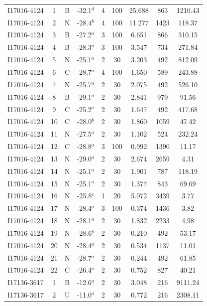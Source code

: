\begin{table}
\begin{tabular}{ccccccccc}
I17016-4124 & 1 & B & -32.1$^{d}$ & 4 & 100 & 25.688 & 863 & 1210.43 \\
I17016-4124 & 2 & N & -28.4$^{b}$ & 4 & 100 & 11.277 & 1423 & 118.37 \\
I17016-4124 & 3 & B & -27.2$^{a}$ & 3 & 100 & 6.651 & 866 & 310.15 \\
I17016-4124 & 4 & B & -28.3$^{a}$ & 3 & 100 & 3.547 & 734 & 271.84 \\
I17016-4124 & 5 & N & -25.1$^{a}$ & 2 & 30 & 3.203 & 492 & 812.09 \\
I17016-4124 & 6 & C & -28.7$^{a}$ & 4 & 100 & 1.650 & 589 & 243.88 \\
I17016-4124 & 7 & N & -25.7$^{a}$ & 2 & 30 & 2.075 & 492 & 526.10 \\
I17016-4124 & 8 & B & -29.1$^{a}$ & 2 & 30 & 2.841 & 979 & 91.56 \\
I17016-4124 & 9 & C & -25.2$^{a}$ & 2 & 30 & 1.647 & 492 & 417.68 \\
I17016-4124 & 10 & C & -28.0$^{b}$ & 2 & 30 & 1.860 & 1059 & 47.42 \\
I17016-4124 & 11 & N & -27.5$^{a}$ & 2 & 30 & 1.102 & 524 & 232.24 \\
I17016-4124 & 12 & C & -28.8$^{a}$ & 3 & 100 & 0.992 & 1390 & 11.17 \\
I17016-4124 & 13 & N & -29.0$^{a}$ & 2 & 30 & 2.674 & 2659 & 4.31 \\
I17016-4124 & 14 & N & -25.1$^{a}$ & 2 & 30 & 1.901 & 787 & 118.19 \\
I17016-4124 & 15 & N & -25.1$^{a}$ & 2 & 30 & 1.377 & 843 & 69.69 \\
I17016-4124 & 16 & N & -25.8$^{c}$ & 1 & 20 & 5.072 & 3439 & 3.77 \\
I17016-4124 & 17 & N & -28.4$^{a}$ & 3 & 100 & 0.374 & 1436 & 3.82 \\
I17016-4124 & 18 & N & -28.1$^{a}$ & 2 & 30 & 1.832 & 2233 & 4.98 \\
I17016-4124 & 19 & N & -28.6$^{b}$ & 2 & 30 & 0.210 & 492 & 53.17 \\
I17016-4124 & 20 & N & -28.4$^{a}$ & 2 & 30 & 0.534 & 1137 & 11.01 \\
I17016-4124 & 21 & N & -28.7$^{a}$ & 2 & 30 & 0.244 & 492 & 61.85 \\
I17016-4124 & 22 & C & -26.4$^{a}$ & 2 & 30 & 0.752 & 827 & 40.21 \\
I17136-3617 & 1 & B & -12.6$^{a}$ & 2 & 30 & 3.048 & 216 & 9111.24 \\
I17136-3617 & 2 & U & -11.0$^{a}$ & 2 & 30 & 0.772 & 216 & 2308.11 \\

\end{tabular}
\end{table}
